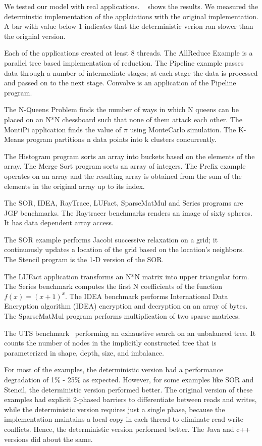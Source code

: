\documentclass[10pt, conference, compsocconf]{IEEEtran}
\begin{document}
We tested our model with real applications.
~
shows the results. We measured the determinstic implementation of the applciations
with the original implementation. A bar with value below 1 indicates that the deterministic
verion ran slower than the orignial version. 

Each of the applications created
at least 8 threads.
The AllReduce Example is a parallel tree based implementation of reduction.
The Pipeline example passes data through a number of intermediate stages; at each
stage the data is processed and passed on to the next stage. Convolve is an
application of the Pipeline program.

The N-Queens Problem finds the number of ways in which N queens can be placed
on an N*N chessboard such that none of them attack each other. The MontiPi application
finds the value of $\pi$ using MonteCarlo simulation. The K-Means program partitions
n data points into k clusters concurrently.

The Histogram program sorts an array into buckets based on the elements of the array.
The Merge Sort program sorts an array of integers.
The Prefix example operates on an array and the resulting array is obtained from the sum
of the elements in the original array up to its index.

The SOR, IDEA, RayTrace, LUFact, SparseMatMul and Series programs are JGF benchmarks.
The Raytracer benchmarks renders an image of sixty spheres. It has data dependent
array access.

The SOR example performs Jacobi successive relaxation
on a grid; it continuously updates a location of the grid based on the location's
neighbors.
The Stencil program is the  1-D version of the SOR.

The LUFact application transforms an N*N matrix into upper triangular form. The Series benchmark
computes the first N coefficients of the function $f(x) = (x+1)^x$. The IDEA benchmark
performs International Data Encryption algorithm  (IDEA) encryption and decryption on an array
of bytes.
The SparseMatMul program performs multiplication of two sparse matrices.


The UTS  benchmark~\cite{olivier2006uts}
performing an exhaustive search on an unbalanced tree.
It  counts the number of
nodes in  the implicitly constructed tree that is parameterized in
 shape, depth, size, and imbalance.

For most of the examples, the deterministic version had a performance degradation
of 1\% - 25\% as expected. However, for some examples like SOR and Stencil, the deterministic
version performed better. The original version of these examples had explicit 2-phased 
barriers to differentiate between reads and writes, while the deterministic
version requires just a single phase, because the implementation maintains
 a local copy in each thread
to eliminate read-write conflicts. Hence, the deterministic
version performed better. The Java and c++ versions did about the same.
\end{document}
